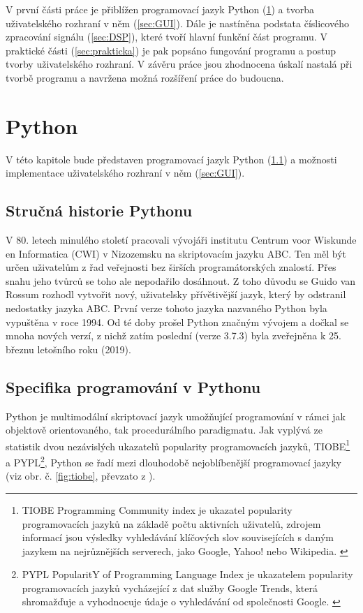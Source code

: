 \documentclass[a4paper, 12pt]{article}
\begin{document}
V první části práce je přiblížen programovací jazyk Python (\ref{sec:python}) a tvorba uživatelského rozhraní v něm (\ref{sec:GUI}). Dále je nastíněna podstata číslicového zpracování signálu (\ref{sec:DSP}), které tvoří hlavní funkční část programu. V praktické části (\ref{sec:prakticka}) je pak popsáno fungování programu a postup tvorby uživatelského rozhraní. V závěru práce jsou zhodnocena úskalí nastalá při tvorbě programu a navržena možná rozšíření práce do budoucna.

\section{Python} \label{sec:python}
V této kapitole bude představen programovací jazyk Python (\ref{sec:history}) a možnosti implementace uživatelského rozhraní v něm (\ref{sec:GUI}).
\subsection{Stručná historie Pythonu} \label{sec:history}
V 80. letech minulého století pracovali vývojáři institutu Centrum voor Wiskunde en Informatica (CWI) v Nizozemsku na skriptovacím jazyku ABC.  Ten měl být určen uživatelům z řad veřejnosti bez širších programátorských znalostí. \cite{PythonHist:1} Přes snahu jeho tvůrců se toho ale nepodařilo dosáhnout. Z toho důvodu se Guido van Rossum rozhodl vytvořit nový, uživatelsky přívětivější jazyk, který by odstranil nedostatky jazyka ABC. První verze tohoto jazyka nazvaného Python byla vypuštěna v roce 1994. \cite{PythonHist:2} Od té doby prošel Python značným vývojem a dočkal se mnoha nových verzí, z nichž zatím poslední (verze 3.7.3) byla zveřejněna k 25. březnu letošního roku (2019). \cite{PythonVersion}

\subsection{Specifika programování v Pythonu} \label{sec:specifika}

Python je multimodální skriptovací jazyk umožňující programování v rámci jak objektově orientovaného, tak procedurálního paradigmatu. \cite{Python3Summerfield:1}
Jak vyplývá ze statistik dvou nezávislých ukazatelů popularity programovacích jazyků, TIOBE\footnote{TIOBE Programming Community index je ukazatel popularity programovacích jazyků na základě počtu aktivních uživatelů, zdrojem informací jsou výsledky vyhledávání klíčových slov souvisejících s daným jazykem na nejrůznějších serverech, jako Google, Yahoo! nebo Wikipedia. \cite{tiobe}} a PYPL\footnote{PYPL PopularitY of Programming Language Index je ukazatelem popularity programovacích jazyků vycházející z dat služby Google Trends, která shromažďuje a vyhodnocuje údaje o vyhledávání od společnosti Google. \cite{pypl}}, Python se řadí mezi dlouhodobě nejoblíbenější programovací jazyky (viz obr. č. \ref{fig:tiobe}, převzato z \cite{tiobe}).
\end{document}
